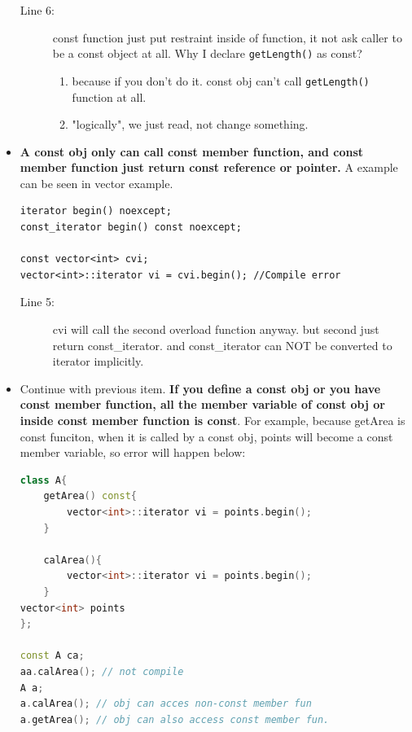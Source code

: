 \documentclass[a4paper,11pt,twoside]{book}
\begin{document}
\begin{itemize}
\begin{description}
	\item[Line 6:] const function just put restraint inside of function, it not ask caller to be a const object at all. Why I declare \texttt{getLength()} as const?
	\begin{enumerate}
		\item because if you don't do it. const obj can't call \texttt{getLength()} function at all. 
		\item "logically", we just read, not change something.
	\end{enumerate}
\end{description}
	
	
	
	
	\item \textbf{A const obj only can call const member function, and const member function just return const reference or pointer.} A example can be seen in vector example.  
	
\begin{lstlisting}
iterator begin() noexcept;
const_iterator begin() const noexcept;
	
const vector<int> cvi;
vector<int>::iterator vi = cvi.begin(); //Compile error
\end{lstlisting}
\begin{description}
	\item[Line 5:] cvi will call the second overload function anyway. but second just return const\_iterator. and const\_iterator can NOT be converted to iterator implicitly.
\end{description}
	
	\item Continue with previous item.\textbf{ If you define a const obj or you have const member function, all the member variable of const obj or inside const member function is const}. For example, because getArea is const funciton, when it is called by a const obj, points will become a const member variable, so error will happen below: 
	
\begin{lstlisting}[frame=single, language=c++]
class A{
	getArea() const{
		vector<int>::iterator vi = points.begin();
	}
	
	calArea(){
		vector<int>::iterator vi = points.begin();
	}
vector<int> points
};
	
const A ca;
aa.calArea(); // not compile	
A a;
a.calArea(); // obj can acces non-const member fun
a.getArea(); // obj can also access const member fun.
\end{lstlisting}


\end{itemize}
\end{document}
